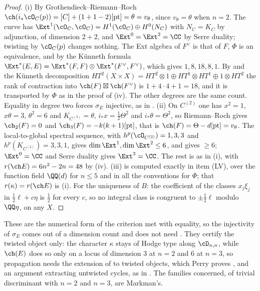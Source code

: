\begin{proof}
(i) By Grothendieck--Riemann--Roch $\ch(i_{*}\cO_{C}(p))=[C]+(1+1-2)[\mathrm{pt}]
=\theta=v_{\theta}$, since $v_{\theta}=\theta$ when $n=2$. The curve has
$\Ext^{1}(\cO_{C},\cO_{C})=H^{1}(\cO_{C})\oplus H^{0}(N_{C})$ with
$N_{C}=K_{C}$ by adjunction, of dimension $2+2$, and $\Ext^{0}=\Ext^{2}=\CC$ by
Serre duality; twisting by $\cO_{C}(p)$ changes nothing. The Ext algebra of
$F^{\vee}$ is that of $F$, $\Phi$ is an equivalence, and by the K\"unneth
formula $\Ext^{*}(E,E)=\Ext^{*}(F,F)\otimes\Ext^{*}(F^{\vee},F^{\vee})$, which
gives $1,8,18,8,1$. By  and the K\"unneth
decomposition $HT^{2}(X\times X)=HT^{2}\otimes1\oplus HT^{1}\otimes HT^{1}\oplus
1\otimes HT^{2}$ the rank of contraction into $\ch(F)\boxtimes\ch(F^{\vee})$ is
$1+4\cdot4+1=18$, and it is transported by $\Phi$ as in the proof of
(iv). The other degrees are the same count. Equality in
degree two forces $\sigma_{E}$ injective, as in .
(ii) On $C^{(2)}$ one has $x^{2}=1$, $x\theta=3$, $\theta^{2}=6$ and
$K_{C^{(2)}}=\theta$, $i_{*}x=\frac12\Theta^{2}$ and $i_{*}\theta=\Theta^{2}$, so
Riemann--Roch gives $\ch_{2}(F)=0$ and $\ch_{3}(F)=-k(k+1)[\mathrm{pt}]$, that
is $\ch(F)=\Theta-d[\mathrm{pt}]=v_{\theta}$. The local-to-global spectral
sequence, with $h^{p}(\cO_{C^{(2)}})=1,3,3$ and $h^{p}(K_{C^{(2)}})=3,3,1$,
gives $\dim\Ext^{1},\dim\Ext^{2}\le6$, and  gives
$\ge6$; $\Ext^{0}=\CC$ and Serre duality gives $\Ext^{3}=\CC$. The rest is as
in (i), with $r(\ch E)=6n^{2}-2n=48$ by (iv). (iii) is
computed exactly in item (LV), over the function field $\QQ(d)$ for $n\le5$
and in all the conventions for $\Phi$; that $r(\kappa)=r(\ch E)$ is
(i). For the uniqueness of $B$: the coefficient of the
classes $x_{j}\xi_{j}$ in $\frac12\ell+c\eta$ is $\frac12$ for every $c$, so no
integral class is congruent to $\pm\frac12\ell$ modulo $\QQ\eta$, on any $X$.
\end{proof}

These are the numerical form of the criterion met with equality, so the
injectivity of $\sigma_{E}$ comes out of a dimension count and does not need
\cite[Question 11.4]{Mar25b}. They certify the twisted object only: the
character $\kappa$ stays of Hodge type along $\cD_{n,n}$, while $\ch(E)$ does
so only on a locus of dimension $3$ at $n=2$ and $6$ at $n=3$, so propagation
needs the extension of  to twisted objects, which Perry proves
\cite{Per26}, and an argument extracting untwisted cycles, as in
\cite[Section 2]{Mar25b}. The families concerned, of trivial discriminant with
$n=2$ and $n=3$, are Markman's.

